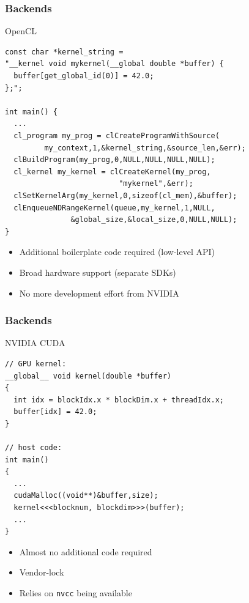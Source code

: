 \begin{frame}[fragile]
\frametitle{Backends}
 \begin{block}{OpenCL}
  { \lstset{ basicstyle=\scriptsize\ttfamily } \begin{lstlisting}
const char *kernel_string =
"__kernel void mykernel(__global double *buffer) {
  buffer[get_global_id(0)] = 42.0;
};";   

int main() {
  ...
  cl_program my_prog = clCreateProgramWithSource(
         my_context,1,&kernel_string,&source_len,&err);
  clBuildProgram(my_prog,0,NULL,NULL,NULL,NULL);
  cl_kernel my_kernel = clCreateKernel(my_prog,
                          "mykernel",&err);
  clSetKernelArg(my_kernel,0,sizeof(cl_mem),&buffer);
  clEnqueueNDRangeKernel(queue,my_kernel,1,NULL,
               &global_size,&local_size,0,NULL,NULL);
} 
  \end{lstlisting} }

  \begin{itemize}
   \item Additional boilerplate code required (low-level API)
   \item Broad hardware support (separate SDKs)
   \item No more development effort from NVIDIA
  \end{itemize}
 \end{block}

\end{frame}



\begin{frame}[fragile]
\frametitle{Backends}
 \begin{block}{NVIDIA CUDA}
  { \lstset{ basicstyle=\scriptsize\ttfamily } \begin{lstlisting}
// GPU kernel:
__global__ void kernel(double *buffer)
{
  int idx = blockIdx.x * blockDim.x + threadIdx.x;
  buffer[idx] = 42.0;
}

// host code:
int main()
{ 
  ...
  cudaMalloc((void**)&buffer,size);
  kernel<<<blocknum, blockdim>>>(buffer);
  ...
}
  \end{lstlisting} }

  \begin{itemize}
   \item Almost no additional code required
   \item Vendor-lock
   \item Relies on \lstinline|nvcc| being available
  \end{itemize}
 \end{block}

\end{frame}



